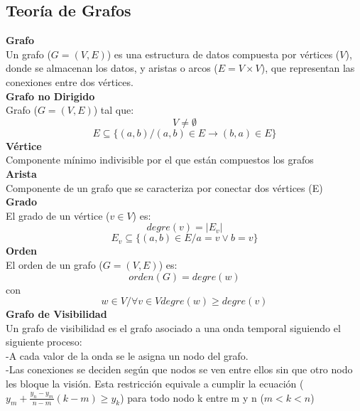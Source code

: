 \documentclass[12pt,a4paper]{article}
\begin{document}
		\subsection{Teoría de Grafos}
			{\textbf{Grafo}}\\
			Un grafo  ($G = (V,E)$) es una estructura de datos compuesta por vértices ($V$), donde se almacenan los datos, y aristas o arcos ($E=V\times V$), que representan las conexiones entre dos vértices.\\
			{\textbf{Grafo no Dirigido}}\\
			Grafo  ($G = (V,E)$) tal que:
			\[ V \neq \emptyset \]
			\[ E\subseteq \{ (a,b) / (a,b)\in E \rightarrow (b,a)\in E  \}  \]
			{\textbf{Vértice}}\\
			Componente mínimo indivisible por el que están compuestos los grafos\\
			{\textbf{Arista}}\\
			Componente de un grafo que se caracteriza por conectar dos vértices (E)\\
			{\textbf{Grado}}\\
			El grado de un vértice ($v\in V$) es:
			\[degre(v)=|E_v|\]
			\[ E_v\subseteq \{ (a,b)\in E / a=v \lor b=v \}  \]
			{\textbf{Orden}}\\
			El orden de un grafo ($G = (V,E)$) es:
			\[orden(G)= degre(w)\]
			con\\
			\[ w\in V / \forall v\in V      degre(w) \geq  degre(v)  \]
			{\textbf{Grafo de Visibilidad}}\\
			Un grafo de visibilidad es el grafo asociado a una onda temporal siguiendo el siguiente proceso:\\
			-A cada valor de la onda se le asigna un nodo del grafo.\\
			-Las conexiones se deciden según que nodos se ven entre ellos sin que otro nodo les bloque la visión. Esta restricción equivale a cumplir la ecuación ($y_m + \frac{y_n-y_m}{n-m}(k-m) \geq y_k$) para todo nodo k entre m y n ($ m < k < n$)\cite{GrafoVisibilidad} \\
\end{document}
